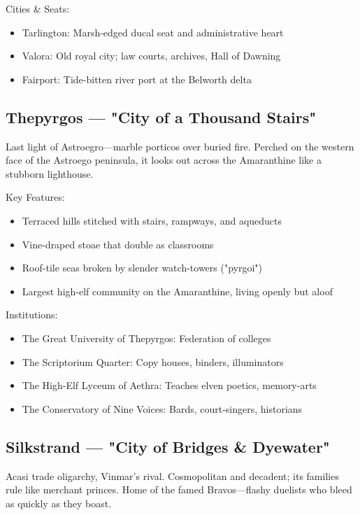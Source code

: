 Cities \& Seats:
\begin{itemize}
    \item Tarlington: Marsh-edged ducal seat and administrative heart
    \item Valora: Old royal city; law courts, archives, Hall of Dawning
    \item Fairport: Tide-bitten river port at the Belworth delta
\end{itemize}

\subsection{Thepyrgos — "City of a Thousand Stairs"}
\label{sec:thepyrgos}

Last light of Astroegro—marble porticos over buried fire. Perched on the western face of the Astroego peninsula, it looks out across the Amaranthine like a stubborn lighthouse.

Key Features:
\begin{itemize}
    \item Terraced hills stitched with stairs, rampways, and aqueducts
    \item Vine-draped stoae that double as classrooms
    \item Roof-tile seas broken by slender watch-towers ("pyrgoi")
    \item Largest high-elf community on the Amaranthine, living openly but aloof
\end{itemize}

Institutions:
\begin{itemize}
    \item The Great University of Thepyrgos: Federation of colleges
    \item The Scriptorium Quarter: Copy houses, binders, illuminators
    \item The High-Elf Lyceum of Aethra: Teaches elven poetics, memory-arts
    \item The Conservatory of Nine Voices: Bards, court-singers, historians
\end{itemize}

\subsection{Silkstrand — "City of Bridges \& Dyewater"}
\label{sec:silkstrand}

Acasi trade oligarchy, Vinmar's rival. Cosmopolitan and decadent; its families rule like merchant princes. Home of the famed Bravos—flashy duelists who bleed as quickly as they boast.

